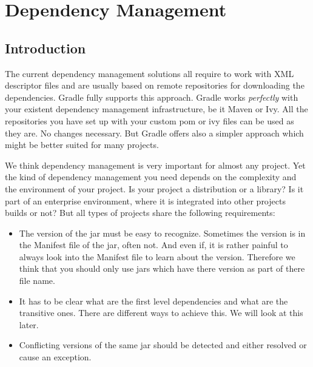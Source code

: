 \chapter{Dependency Management}
\label{cha:dependency_management}
\section{Introduction} %
\label{sec:Introduction}
The current dependency management solutions all require to work with XML descriptor files and are usually based on remote repositories for downloading the dependencies. Gradle fully supports this approach. Gradle works \emph{perfectly} with your existent dependency management infrastructure, be it Maven or Ivy. All the repositories you have set up with your custom pom or ivy files can be used as they are. No changes necessary. But Gradle offers also a simpler approach which might be better suited for many projects.

We think dependency management is very important for almost any project. Yet the kind of dependency management you need depends on the complexity and the environment of your project. Is your project a distribution or a library? Is it part of an enterprise environment, where it is integrated into other projects builds or not? But all types of projects share the following requirements:
\begin{itemize}
\item The version of the jar must be easy to recognize. Sometimes the version is in the Manifest file of the jar, often not. And even if, it is rather painful to always look into the Manifest file to learn about the version. Therefore we think that you should only use jars which have there version as part of there file name.
\item It has to be clear what are the first level dependencies and what are the transitive ones. There are different ways to achieve this. We will look at this later.
\item Conflicting versions of the same jar should be detected and either resolved or cause an exception.
\end{itemize}

